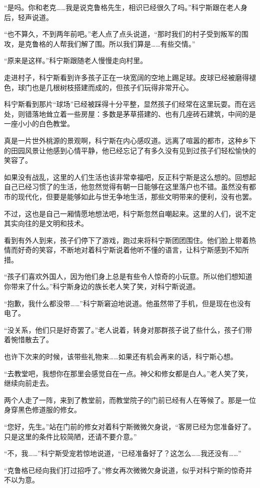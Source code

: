 “是吗。你和老克……我是说克鲁格先生，相识已经很久了吗。”科宁斯跟在老人身后，轻声说道。

“也不算久，不到两年前吧。”老人点了点头说道，“那时我们的村子受到叛军的围攻，是克鲁格的人帮我们解了围。所以我们算是……有些交情。”

“原来是这样。”科宁斯跟随老人慢慢走向村里。

走进村子，科宁斯看到许多孩子正在一块宽阔的空地上踢足球。皮球已经被磨得褪色，球门也是几根树枝搭建而成的，但孩子们玩得非常开心。

科宁斯看到那片“球场”已经被踩得十分平整，显然孩子们经常在这里玩耍。而在远处，则错落地耸立着一些房屋：多数是茅草搭建的、也有几座砖石建筑，中间的是一座小小的白色教堂。

真是一片世外桃源的景观啊，科宁斯在内心感叹道。远离了喧嚣的都市，这种乡下的田园风景让他感到心情平静，他已经忘记了有多久没有见到过孩子们轻松愉快的笑容了。

如果没有战乱，这里的人们生活也该非常幸福吧，反正科宁斯是这么想的。回想起自己已经习惯了的生活，他忽然觉得有朝一日能够在这里落户也不错。虽然没有都市的现代化，但要是能够如此与世无争地生活，那些文明带来的便利，没有也罢。

不过，这也是自己一厢情愿地想法吧，科宁斯忽然自嘲起来。这里的人们，说不定其实向往的是文明和技术。

看到有外人到来，孩子们停下了游戏，跑过来将科宁斯团团围住。他们脸上带着热情而好奇的笑容，不断地对着科宁斯说着他听不懂的语言，让科宁斯感到不知所措。

“孩子们喜欢外国人，因为他们身上总是有些令人惊奇的小玩意。所以他们想知道你带来了什么。”科宁斯身边的族长老人笑了笑，对科宁斯说道。

“抱歉，我什么都没带……”科宁斯窘迫地说道。他虽然带了手机，但是现在也没有电了。

“没关系，他们只是好奇罢了。”老人说着，转身对那群孩子说了些什么，孩子们带着惋惜散去了。

也许下次来的时候，该带些礼物来……如果还有机会再来的话，科宁斯心想。

“去教堂吧，我想你在那里会感觉自在一点。神父和修女都是白人。”老人笑了笑，继续向前走去。

两个人走了一阵，来到了教堂前，而教堂院子的门前已经有人在等候了。那是一位身穿黑色修道服的修女。

“您好，先生。”站在门前的修女对着科宁斯微微欠身说，“客房已经为您准备好了。只是这里的条件比较简陋，还请不要介意。”

“不，我……”科宁斯受宠若惊地说道，“已经准备好了？这怎么……我还没有……”

“克鲁格已经向我们打过招呼了。”修女再次微微欠身说道，似乎对科宁斯的惊奇并不以为意。

